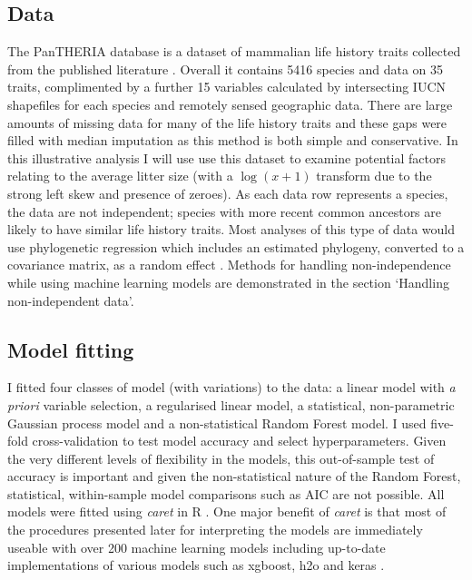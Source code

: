 \documentclass[10pt,]{article}
\begin{document}
\subsection{Data}\label{data}

The PanTHERIA database is a dataset of mammalian life history traits collected from the published literature \citep{jones2009pantheria}.
Overall it contains 5416 species and data on 35 traits, complimented by a further 15 variables calculated by intersecting IUCN shapefiles for each species and remotely sensed geographic data.
There are large amounts of missing data for many of the life history traits and these gaps were filled with median imputation as this method is both simple and conservative.
In this illustrative analysis I will use use this dataset to examine potential factors relating to the average litter size (with a \(\log(x+1)\) transform due to the strong left skew and presence of zeroes).
As each data row represents a species, the data are not independent; species with more recent common ancestors are likely to have similar life history traits.
Most analyses of this type of data \citep{gay2014parasite, pellissier2012shifts, ferguson2014colony} would use phylogenetic regression which includes an estimated phylogeny, converted to a covariance matrix, as a random effect \citep{magnusson2017glmmtmb, caper}.
Methods for handling non-independence while using machine learning models are demonstrated in the section `Handling non-independent data'.

\subsection{Model fitting}\label{model-fitting}

I fitted four classes of model (with variations) to the data: a linear model with \emph{a priori} variable selection, a regularised linear model, a statistical, non-parametric Gaussian process model and a non-statistical Random Forest model.
I used five-fold cross-validation to test model accuracy and select hyperparameters.
Given the very different levels of flexibility in the models, this out-of-sample test of accuracy is important and given the non-statistical nature of the Random Forest, statistical, within-sample model comparisons such as AIC are not possible.
All models were fitted using \emph{caret} \citep{caret} in R \citep{R}.
One major benefit of \emph{caret} is that most of the procedures presented later for interpreting the models are immediately useable with over 200 machine learning models including up-to-date implementations of various models such as xgboost, h2o and keras \citep{xgboost, h2o, keras}.
\end{document}
